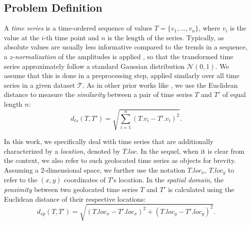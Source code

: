 \subsection{Problem Definition}
\label{sec:problem}



A {\em time series} is a time-ordered sequence of values $T = \{v_1, \ldots, v_n\}$, where $v_i$ is the value at the $i$-th time point and $n$ is the length of the series. Typically, as absolute values are usually less informative compared to the trends in a sequence, a $z$-{\em normalization} of the amplitudes is applied \cite{DBLP:conf/cp/GoldinK95}, so that the transformed time series approximately follow a standard Gaussian distribution $\mathcal{N}(0,1)$. We assume that this is done in a preprocessing step, applied similarly over all time series in a given dataset $\mathcal{T}$. As in other prior works like \cite{shieh2008kdd}, we use the Euclidean distance to measure the {\em similarity} between a pair of time series $T$ and $T'$ of equal length $n$:
\begin{equation} \label{eq:dist_ts}
d_{ts}(T, T') = \sqrt{\displaystyle \sum_{i=1}^{n}(T.v_i - T'.v_i)^2}.
\end{equation}

In this work, we specifically deal with time series that are additionally characterized by a \emph{location}, denoted by $T.loc$. In the sequel, when it is clear from the context, we also refer to such geolocated time series as objects for brevity.  Assuming a 2-dimensional space, we further use the notation $T.loc_x$, $T.loc_y$ to refer to the $(x,y)$ coordinates of $T$'s location. In the {\em spatial domain}, the {\em proximity} between two geolocated time series $T$ and $T'$ is calculated using the Euclidean distance of their respective locations:
\begin{equation} \label{eq:dist_sp2}
d_{sp}(T, T') = \sqrt{(T.loc_x - T'.loc_x)^2 + (T.loc_y - T'.loc_y)^2}.
\end{equation}



